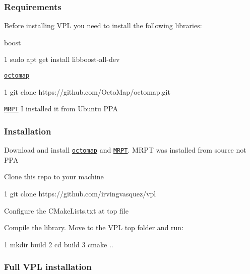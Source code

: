 \subsubsection*{Requirements}

Before installing V\+PL you need to install the following libraries\+:
\begin{DoxyItemize}
\item boost 
\begin{DoxyCode}
1 sudo apt get install libboost-all-dev
\end{DoxyCode}

\item \href{https://octomap.github.io/>}{\tt octomap} 
\begin{DoxyCode}
1 git clone https://github.com/OctoMap/octomap.git
\end{DoxyCode}

\item \href{http://www.mrpt.org/>}{\tt M\+R\+PT} I installed it from Ubuntu P\+PA
\end{DoxyItemize}

\subsubsection*{Installation}


\begin{DoxyEnumerate}
\item Download and install \href{https://octomap.github.io/>}{\tt octomap} and \href{http://www.mrpt.org/>}{\tt M\+R\+PT}. M\+R\+PT was installed from source not P\+PA
\item Clone this repo to your machine 
\begin{DoxyCode}
1 git clone https://github.com/irvingvasquez/vpl
\end{DoxyCode}

\item Configure the C\+Make\+Lists.\+txt at top file
\item Compile the library. Move to the V\+PL top folder and run\+: 
\begin{DoxyCode}
1 mkdir build
2 cd build 
3 cmake ..
\end{DoxyCode}

\end{DoxyEnumerate}

\subsubsection*{Full V\+PL installation}

